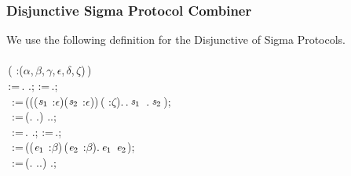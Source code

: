 \subsubsection{Disjunctive Sigma Protocol Combiner}
We use the following definition for the Disjunctive of Sigma Protocols.\\
\\
\,( :(\ensuremath{\alpha},\,\ensuremath{\beta},\,\ensuremath{\gamma},\,\ensuremath{\epsilon},\,\ensuremath{\delta},\,\ensuremath{\zeta})\,)\,\HOLSymConst{=}\\
\HOLTokenLeftrec{}\,:=\,.\,\HOLSymConst{\ensuremath{\times}}\,.;\,\,:=\,.;\\
\,\,\,:=\,(\HOLTokenLambda{}((\ensuremath{\HOLBoundVar{s}\sb{\mathrm{1}}} :\ensuremath{\epsilon})\HOLSymConst{,}(\ensuremath{\HOLBoundVar{s}\sb{\mathrm{2}}} :\ensuremath{\epsilon}))\,( :\ensuremath{\zeta}).\,.\,\ensuremath{\HOLBoundVar{s}\sb{\mathrm{1}}}\,\,\HOLSymConst{\HOLTokenDisj{}}\,.\,\ensuremath{\HOLBoundVar{s}\sb{\mathrm{2}}}\,);\\
\,\,\,:=\,(.\,\HOLSymConst{\ensuremath{\times}}\,.)\,\HOLSymConst{\ensuremath{\times}}\,..;\\
\,\,\,:=\,.\,\HOLSymConst{\ensuremath{\times}}\,.;\,\,:=\,.;\\
\,\,\,:=\,(\HOLTokenLambda{}(\ensuremath{\HOLBoundVar{e}\sb{\mathrm{1}}} :\ensuremath{\beta})\,(\ensuremath{\HOLBoundVar{e}\sb{\mathrm{2}}} :\ensuremath{\beta}).\,\ensuremath{\HOLBoundVar{e}\sb{\mathrm{1}}}\,\HOLSymConst{\HOLTokenNotEqual{}}\,\ensuremath{\HOLBoundVar{e}\sb{\mathrm{2}}});\\
\,\,\,:=\,(.\,\HOLSymConst{\ensuremath{\times}}\,..)\,\HOLSymConst{\ensuremath{\times}}\,.;\\
